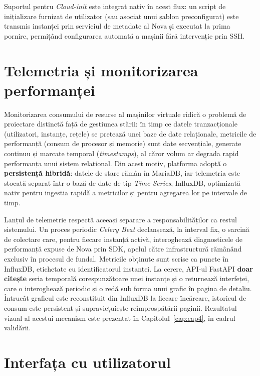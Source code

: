 Suportul pentru \textit{Cloud-init} este integrat nativ în acest flux: un script de inițializare furnizat de utilizator (sau asociat unui șablon preconfigurat) este transmis instanței prin serviciul de metadate al Nova și executat la prima pornire, permițând configurarea automată a mașinii fără intervenție prin SSH.

\section{Telemetria și monitorizarea performanței}
\label{sec:cap3_telemetrie}

Monitorizarea consumului de resurse al mașinilor virtuale ridică o problemă de proiectare distinctă față de gestiunea stării: în timp ce datele tranzacționale (utilizatori, instanțe, rețele) se pretează unei baze de date relaționale, metricile de performanță (consum de procesor și memorie) sunt date secvențiale, generate continuu și marcate temporal (\textit{timestamps}), al căror volum ar degrada rapid performanța unui sistem relațional. Din acest motiv, platforma adoptă o \textbf{persistență hibridă}: datele de stare rămân în MariaDB, iar telemetria este stocată separat într-o bază de date de tip \textit{Time-Series}, InfluxDB, optimizată nativ pentru ingestia rapidă a metricilor și pentru agregarea lor pe intervale de timp.

Lanțul de telemetrie respectă aceeași separare a responsabilităților ca restul sistemului. Un proces periodic \textit{Celery Beat} declanșează, la interval fix, o sarcină de colectare care, pentru fiecare instanță activă, interoghează diagnosticele de performanță expuse de Nova prin SDK, apelul către infrastructură rămânând exclusiv în procesul de fundal. Metricile obținute sunt scrise ca puncte în InfluxDB, etichetate cu identificatorul instanței. La cerere, API-ul FastAPI \textbf{doar citește} seria temporală corespunzătoare unei instanțe și o returnează interfeței, care o interoghează periodic și o redă sub forma unui grafic în pagina de detaliu. Întrucât graficul este reconstituit din InfluxDB la fiecare încărcare, istoricul de consum este persistent și supraviețuiește reîmprospătării paginii. Rezultatul vizual al acestui mecanism este prezentat în Capitolul~\ref{cap:cap4}, în cadrul validării.

\section{Interfața cu utilizatorul}
\label{sec:cap3_interfata}

